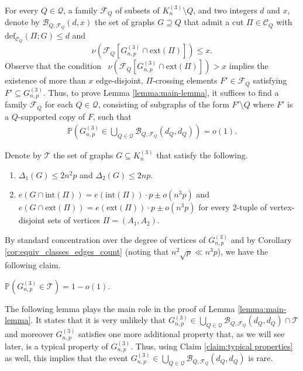 \documentclass[11pt,a4paper,oneside,reqno]{amsart}
\newcommand{\Gnp}{G_{n, p}^{(3)}}
\newcommand{\cB}{\mathcal{B}}
\newcommand{\cC}{\mathcal{C}}
\newcommand{\cF}{\mathcal{F}}
\newcommand{\cQ}{\mathcal{Q}}
\newcommand{\cT}{\mathcal{T}}
\renewcommand{\Pr}{\mathbb{P}}
\newcommand{\1}{\mathbbm{1}} %
\renewcommand{\le}{\leqslant}
\newcommand{\deficit}{\mathrm{def}}
\newcommand{\ext}{\mathrm{ext}}
\renewcommand{\int}{\mathrm{int}}
\begin{document}
For every $Q \in \cQ$, a family $\cF_Q$ of subsets of $K_n^{(3)} \setminus Q$, and two integers $d$ and $x$, denote by $\cB_{Q, \cF_Q}(d, x)$ the set of graphs $G \supseteq Q$ that admit a cut $\Pi \in \cC_Q$ with $\deficit_{\cC_Q}(\Pi; G) \le d$ and 
\[
    \nu\left(\cF_Q\left[\Gnp \cap \ext\left(\Pi\right)\right]\right) \le x.
\]
Observe that the condition ~$\nu\left(\cF_Q\left[\Gnp \cap \ext\left(\Pi\right)\right]\right) > x$ implies the existence of more than $x$ edge-disjoint, $\Pi$-crossing elements $F' \in \cF_Q$ satisfying $F' \subseteq \Gnp$. Thus, to prove Lemma \ref{lemma:main-lemma}, it suffices to find a family $\cF_Q$ for each $Q \in \cQ$, consisting of subgraphs of the form $F' \setminus Q$ where $F'$ is a $Q$-supported copy of $F$, such that
\begin{align}\label{align:main-lemma-desired-probability}
    \Pr\left(\Gnp \in \bigcup_{Q \in \cQ} \cB_{Q, \cF_Q}(d_Q, d_Q)\right) = o(1).
\end{align}

Denote by $\cT$ the set of graphs $G \subseteq K_n^{(3)}$ that satisfy the following.
\begin{enumerate}
    \item $\Delta_1(G) \le 2n^2 p$ and $\Delta_2(G) \le 2np$.
    \item $e(G \cap \int(\Pi)) = e(\int(\Pi)) \cdot p \pm o(n^3 p)$ and $e(G \cap \ext(\Pi)) = e(\ext(\Pi)) \cdot p \pm o(n^3 p)$ for every $2$-tuple of vertex-disjoint sets of vertices $\Pi = (A_1, A_2)$.
\end{enumerate}
By standard concentration over the degree of vertices of $\Gnp$ and by Corollary \ref{cor:equiv_classes_edges_count} (noting that $n^2 \sqrt{p} \ll n^3 p$), we have the following claim.
\begin{claim}\label{claim:typical properties}
    $\Pr\left(\Gnp \in \cT\right) = 1 - o(1)$.
\end{claim}

The following lemma plays the main role in the proof of Lemma \ref{lemma:main-lemma}. It states that it is very unlikely that $\Gnp \in \bigcup_{Q \in \cQ} \cB_{Q, \cF_Q}(d_Q, d_Q) \cap \cT$ and moreover $\Gnp$ satisfies one more additional property that, as we will see later, is a typical property of $\Gnp$. Thus, using Claim \ref{claim:typical properties} as well, this implies that the event $\Gnp \in \bigcup_{Q \in \cQ} \cB_{Q, \cF_Q}(d_Q, d_Q)$ is rare. 
\end{document}
